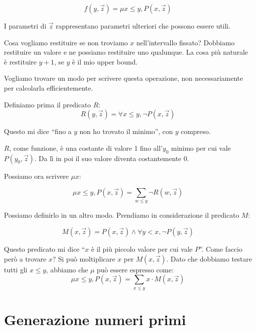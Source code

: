\begin{equation*}
    f(y,\vec{z}) = \mu x \leq y, P(x,\vec{z})
\end{equation*}

I parametri di $\vec{z}$ rappresentano parametri ulteriori che possono essere utili.

Cosa vogliamo restituire se non troviamo $x$ nell'intervallo fissato? Dobbiamo restituire un valore
e ne possiamo restituire uno qualunque. La cosa più naturale è restituire $y + 1$, se $y$ è il
mio upper bound.

Vogliamo trovare un modo per scrivere questa operazione, non necessariamente per calcolarla
efficientemente.

Definiamo prima il predicato $R$:
\begin{equation*}
    R(y,\vec{z}) = \forall x \leq y, \lnot P(x,\vec{z})
\end{equation*}

Questo mi dice ``fino a $y$ non ho trovato il minimo'', con $y$ compreso.

$R$, come funzione, è una costante di valore 1 fino all'$y_{0}$ minimo per cui vale
$P(y_{0},\vec{z})$. Da lì in poi il suo valore diventa costantemente 0.

Possiamo ora scrivere $\mu x$:

\begin{equation*}
    \mu x \leq y, P(x,\vec{z}) = \sum_{w \leq y}\lnot R(w,\vec{z})
\end{equation*}

Possiamo definirlo in un altro modo. Prendiamo in considerazione il predicato $M$:

\begin{equation*}
    M(x,\vec{z}) = P(x,\vec{z}) \land \forall y < x, \lnot P(y,\vec{z})
\end{equation*}

Questo predicato mi dice ``$x$ è il più piccolo valore per cui vale $P$''. Come faccio però a trovare
$x$? Si può moltiplicare $x$ per $M(x,\vec{z})$. Dato che dobbiamo testare tutti gli $x \leq y$, abbiamo
che $\mu$ può essere espresso come:
\begin{equation*}
    \mu x \leq y, P(x,\vec{z}) = \sum_{x \leq y} x \cdot M(x,\vec{z})
\end{equation*}

\section{Generazione numeri primi}

